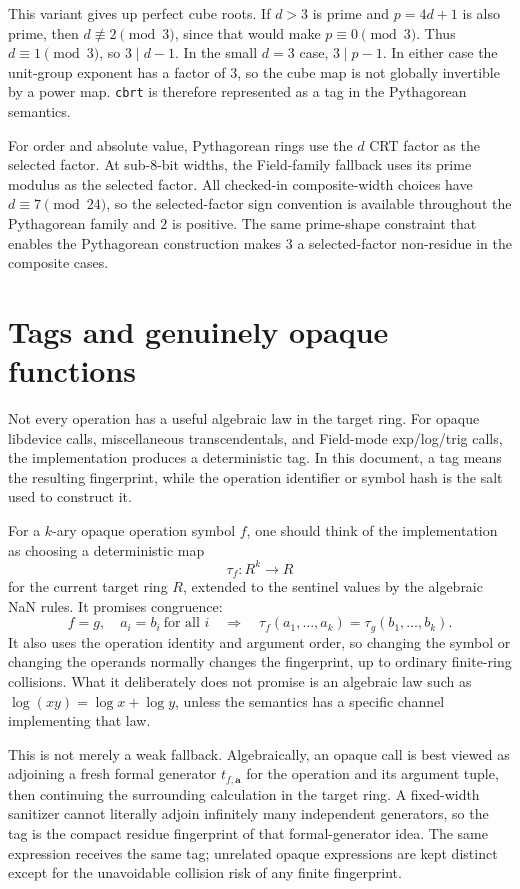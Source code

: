 \documentclass[11pt]{article}
\theoremstyle{plain}
\begin{document}
This variant gives up perfect cube roots.  If \(d>3\) is prime and
\(p=4d+1\) is also prime, then \(d\not\equiv 2\pmod 3\), since that would make
\(p\equiv 0\pmod 3\).  Thus \(d\equiv 1\pmod 3\), so \(3\mid d-1\).  In the
small \(d=3\) case, \(3\mid p-1\).  In either case the unit-group exponent has a
factor of \(3\), so the cube map is not globally invertible by a power map.
\texttt{cbrt} is therefore represented as a tag in the Pythagorean semantics.

For order and absolute value, Pythagorean rings use the \(d\) CRT factor as the
selected factor.  At sub-\(8\)-bit widths, the Field-family fallback uses its
prime modulus as the selected factor.  All checked-in composite-width choices
have \(d\equiv7\pmod {24}\), so the selected-factor sign convention is
available throughout the Pythagorean family and \(2\) is positive.  The same
prime-shape constraint that enables the Pythagorean construction makes \(3\) a
selected-factor non-residue in the composite cases.

\section{Tags and genuinely opaque functions}

Not every operation has a useful algebraic law in the target ring.  For
opaque libdevice calls, miscellaneous transcendentals, and Field-mode
exp/log/trig calls, the implementation produces a deterministic tag.  In this
document, a tag means the resulting fingerprint, while the operation identifier
or symbol hash is the salt used to construct it.

For a \(k\)-ary opaque operation symbol \(f\), one should think of the
implementation as choosing a deterministic map
\[
  \tau_f:R^k\longrightarrow R
\]
for the current target ring \(R\), extended to the sentinel values by the
algebraic NaN rules.  It promises congruence:
\[
  f=g,\quad a_i=b_i\ \text{for all }i
  \quad\Longrightarrow\quad
  \tau_f(a_1,\ldots,a_k)=\tau_g(b_1,\ldots,b_k).
\]
It also uses the operation identity and argument order, so changing the symbol
or changing the operands normally changes the fingerprint, up to ordinary
finite-ring collisions.  What it deliberately does not promise is an algebraic
law such as \(\log(xy)=\log x+\log y\), unless the semantics has a specific
channel implementing that law.

This is not merely a weak fallback.  Algebraically, an opaque call is best
viewed as adjoining a fresh formal generator \(t_{f,\mathbf a}\) for the
operation and its argument tuple, then continuing the surrounding calculation in
the target ring.  A fixed-width sanitizer cannot literally adjoin infinitely
many independent generators, so the tag is the compact residue fingerprint of
that formal-generator idea.  The same expression receives the same tag;
unrelated opaque expressions are kept distinct except for the unavoidable
collision risk of any finite fingerprint.
\end{document}
